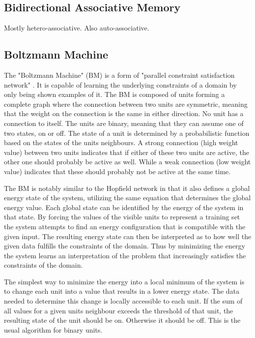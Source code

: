 \documentclass[12pt, a4paper]{article}
\begin{document}

\subsection{Bidirectional Associative Memory}

Mostly hetero-associative. Also auto-associative.

\subsection{Boltzmann Machine}


The "Boltzmann Machine" (BM) is a form of "parallel constraint satisfaction network" \cite{ackley1985learning}. It is capable of learning the underlying constraints of a domain by only being shown examples of it. The BM is composed of units forming a complete graph where the connection between two units are symmetric, meaning that the weight on the connection is the same in either direction. No unit has a connection to itself. The units are binary, meaning that they can assume one of two states, on or off. The state of a unit is determined by a probabilistic function based on the states of the units neighbours. A strong connection (high weight value) between two units indicates that if either of these two units are active, the other one should probably be active as well. While a weak connection (low weight value) indicates that these should probably not be active at the same time.

The BM is notably similar to the Hopfield network in that it also defines a global energy state of the system, utilizing the same equation that determines the global energy value. Each global state can be identified by the energy of the system in that state. By forcing the values of the visible units to represent a training set the system attempts to find an energy configuration that is compatible with the given input. The resulting energy state can then be interpreted as to how well the given data fulfills the constraints of the domain. Thus by minimizing the energy the system learns an interpretation of the problem that increasingly satisfies the constraints of the domain.

The simplest way to minimize the energy into a local minimum of the system is to change each unit into a value that results in a lower energy state. The data needed to determine this change is locally accessible to each unit. If the sum of all values for a given units neighbour exceeds the threshold of that unit, the resulting state of the unit should be on. Otherwise it should be off. This is the usual algorithm for binary units.
\end{document}
